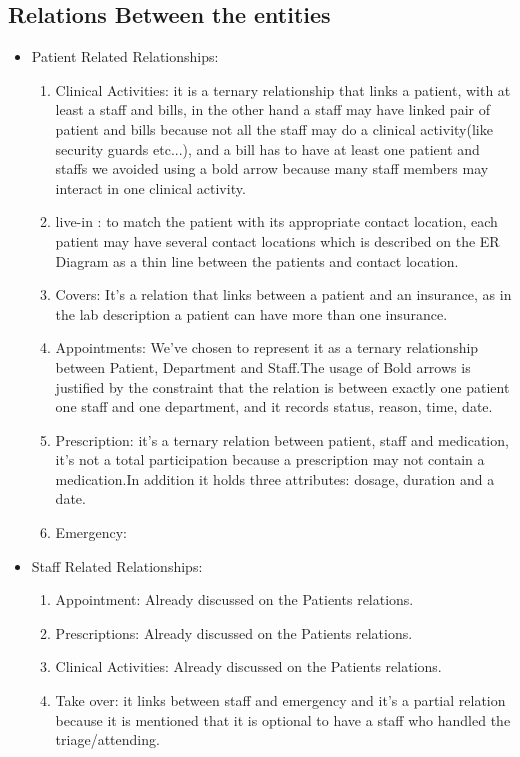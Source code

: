 \documentclass[a4paper,12pt]{article}
\begin{document}
\subsection{Relations Between the entities}
\begin{itemize}
    \item Patient Related Relationships:
    \begin{enumerate}
        \item Clinical Activities: it is a ternary relationship that links a patient, with at least a staff and bills, in the other hand a staff may have linked pair of patient and bills because not all the staff may do a clinical activity(like security guards etc...), and a bill has to have at least one patient and staffs we avoided using a bold arrow because many staff members may interact in one clinical activity.
        \item live-in : to match the patient with its appropriate contact location, each patient may have several contact locations which is described on the ER Diagram as a thin line between the patients and contact location. 
        \item Covers: It's a relation that links between a patient and an insurance, as in the lab description a patient can have more than one insurance.
        \item Appointments: We've chosen to represent it as a ternary relationship between Patient, Department and Staff.The usage of Bold arrows is justified by the constraint that the relation is between exactly one patient one staff and one department, and it records status, reason, time, date.
        \item Prescription: it's a ternary relation between patient, staff and medication, it's not a total participation because a prescription may not contain a medication.In addition it holds three attributes: dosage, duration and a date.
        \item Emergency: 
    \end{enumerate}
    \item Staff Related Relationships:
    \begin{enumerate}
        \item Appointment: Already discussed on the Patients relations.
        \item Prescriptions: Already discussed on the Patients relations.
        \item Clinical Activities: Already discussed on the Patients relations.
        \item Take over: it links between staff and emergency and it's a partial relation because it is mentioned that it is optional to have a staff who handled the triage/attending. 

\end{enumerate}
\end{itemize}
\end{document}
